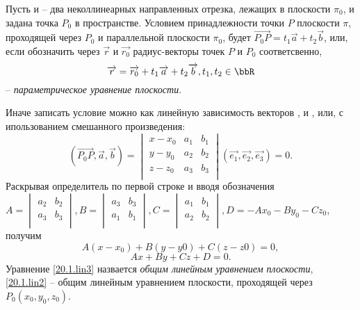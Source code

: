 Пусть  и  -- два неколлинеарных направленных отрезка, лежащих в плоскости $\pi_0$, и задана точка $P_0$ в пространстве. Условием принадлежности точки $P$ плоскости $\pi$, проходящей через $P_0$ и параллельной плоскости $\pi_0$, будет $\overrightarrow{P_0P}=t_1\overrightarrow{a}+t_2\overrightarrow{b}$, или, если обозначить через $\overrightarrow{r}$ и $\overrightarrow{r_0}$ радиус-векторы точек $P$ и $P_0$ соответсвенно,
\begin{equation}\label{20.1.par3}
\overrightarrow{r}=\overrightarrow{r_0}+t_1\overrightarrow{a}+t_2\overrightarrow{b}, t_1,t_2 \in \bbR
\end{equation}
-- \textit{параметрическое уравнение плоскости}.

Иначе записать условие можно как линейную зависимость векторов ,  и , или, с ипользованием смешанного произведения:
\begin{equation}\label{20.1.mix1}
(\overrightarrow{P_0P},\overrightarrow{a}, \overrightarrow{b})=\begin{vmatrix}
x-x_0 & a_1 & b_1 \\
y-y_0 & a_2 & b_2 \\
z-z_0 & a_3 & b_3 \\
\end{vmatrix}(\overrightarrow{e_1},\overrightarrow{e_2},\overrightarrow{e_3})=0.
\end{equation}
Раскрывая определитель по первой строке и вводя обозначения $A=\begin{vmatrix}
a_2 & b_2 \\
a_3 & b_3 \\
\end{vmatrix}, B=\begin{vmatrix}
a_3 & b_3 \\
a_1 & b_1 \\
\end{vmatrix}, C=\begin{vmatrix}
a_1 & b_1 \\
a_2 & b_2 \\
\end{vmatrix}, D=-Ax_0-By_0-Cz_0$, получим
\begin{equation}\label{20.1.lin2}
A(x-x_0)+B(y-y0)+C(z-z0)=0,
\end{equation}
\begin{equation}\label{20.1.lin3}
Ax+By+Cz+D=0.
\end{equation}
Уравнение \ref{20.1.lin3} назвается \textit{общим линейным уравнением плоскости}, \ref{20.1.lin2} -- общим линейным уравнением плоскости, проходящей через $P_0(x_0,y_0,z_0)$.

